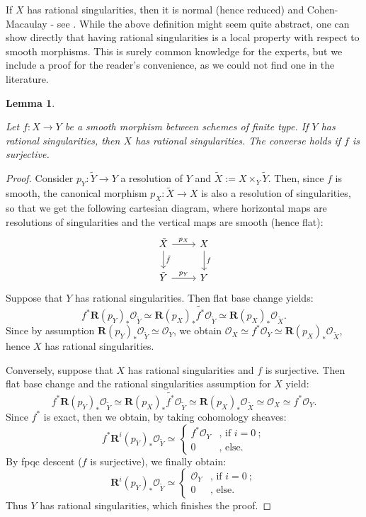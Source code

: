 \documentclass[11pt,english]{article}
\numberwithin{equation}{section}
\numberwithin{figure}{section}
\theoremstyle{definition}
\theoremstyle{plain}
\newtheorem{lem}[df]{Lemma}
\theoremstyle{remark}
\begin{document}
If $X$ has rational singularities, then it is normal (hence reduced)
and Cohen-Macaulay - see \cite[II.1.]{Elk78}. While the above definition
might seem quite abstract, one can show directly that having rational
singularities is a local property with respect to smooth morphisms.
This is surely common knowledge for the experts, but we include a
proof for the reader's convenience, as we could not find one in the
literature.

\begin{lem} \label{Lem/RatSgDesc}

Let $f:X\rightarrow Y$ be a smooth morphism between schemes of finite
type. If $Y$ has rational singularities, then $X$ has rational singularities.
The converse holds if $f$ is surjective.

\end{lem}

\begin{proof}

Consider $p_{Y}:\tilde{Y}\rightarrow Y$ a resolution of $Y$ and
$\tilde{X}:=X\times_{Y}\tilde{Y}$. Then, since $f$ is smooth, the
canonical morphism $p_{X}:\tilde{X}\rightarrow X$ is also a resolution
of singularities, so that we get the following cartesian diagram,
where horizontal maps are resolutions of singularities and the vertical
maps are smooth (hence flat):\[
\begin{tikzcd}[ampersand replacement = \&]
\tilde{X}\ar[r, "p_X"]\ar[d, "\tilde{f}"] \& X \ar[d, "f"] \\
\tilde{Y}\ar[r, "p_Y"] \& Y
\end{tikzcd}
\]Suppose that $Y$ has rational singularities. Then flat base change
yields:\[
f^{*}\textbf{R}(p_{Y})_*\mathcal{O}_{\tilde{Y}}\simeq\textbf{R}(p_{X})_*\tilde{f^{*}}\mathcal{O}_{\tilde{Y}}\simeq\textbf{R}(p_{X})_*\mathcal{O}_{\tilde{X}}.
\]Since by assumption $\textbf{R}(p_{Y})_{*}\mathcal{O}_{\tilde{Y}}\simeq\mathcal{O}_{Y}$,
we obtain $\mathcal{O}_{X}\simeq f^{*}\mathcal{O}_{Y}\simeq\textbf{R}(p_{X})_{*}\mathcal{O}_{\tilde{X}}$,
hence $X$ has rational singularities.

Conversely, suppose that $X$ has rational singularities and $f$
is surjective. Then flat base change and the rational singularities
assumption for $X$ yield:\[
f^{*}\textbf{R}(p_{Y})_*\mathcal{O}_{\tilde{Y}}\simeq\textbf{R}(p_{X})_*\tilde{f^{*}}\mathcal{O}_{\tilde{Y}}\simeq\textbf{R}(p_{X})_*\mathcal{O}_{\tilde{X}}\simeq\mathcal{O}_{X}\simeq f^{*}\mathcal{O}_{Y}.
\]Since $f^{*}$ is exact, then we obtain, by taking cohomology sheaves:\[
f^*\textbf{R}^{i}(p_Y)_{*}\mathcal{O}_{\tilde{Y}}\simeq
\left\{
\begin{array}{ll}
f^*\mathcal{O}_{Y} & \text{, if }i=0 \ ; \\
0 & \text{, else.}
\end{array}
\right.
\]By fpqc descent ($f$ is surjective), we finally obtain:\[
\textbf{R}^{i}(p_Y)_{*}\mathcal{O}_{\tilde{Y}}\simeq
\left\{
\begin{array}{ll}
\mathcal{O}_{Y} & \text{, if }i=0 \ ; \\
0 & \text{, else.}
\end{array}
\right.
\]Thus $Y$ has rational singularities, which finishes the proof. \end{proof}
\end{document}
